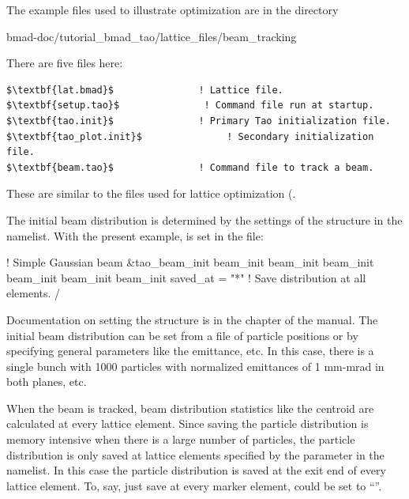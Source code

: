 \documentclass{hitec}     %
\begin{document}
{The example files used to illustrate optimization are in the directory 
\begin{code}
bmad-doc/tutorial_bmad_tao/lattice_files/beam_tracking
\end{code}
There are five files here:
\begin{lstlisting}[mathescape]
$\textbf{lat.bmad}$               ! Lattice file.
$\textbf{setup.tao}$               ! Command file run at startup.
$\textbf{tao.init}$               ! Primary Tao initialization file.
$\textbf{tao_plot.init}$               ! Secondary initialization file.
$\textbf{beam.tao}$               ! Command file to track a beam.
\end{lstlisting}
These are similar to the files used for lattice optimization (.

The initial beam distribution is determined by the settings of the  
structure in the  namelist. With the present example,  is 
set in the  file:
\begin{code}
! Simple Gaussian beam 
&tao_beam_init
  beam_init%
  beam_init%
  beam_init%
  beam_init%
  beam_init%
  beam_init%
  saved_at =  "*"                 ! Save distribution at all elements. 
/
\end{code}
Documentation on setting the  structure is in the  
chapter of the \bmad manual. The initial beam distribution can be set from a file of
particle positions or by specifying general parameters like the emittance, etc. In this case,
there is a single bunch with 1000 particles with normalized emittances of 1 mm-mrad in both
planes, etc. 

When the beam is tracked, beam distribution statistics like the centroid are calculated at every
lattice element. Since saving the particle distribution is memory intensive when there is a large
number of particles, the particle distribution is only saved at lattice elements specified
by the  parameter in the  namelist. In this case the 
particle distribution is saved at the exit end of every lattice element. To, say, just save
at every marker element,  could be set to ``''.

}
\end{document}
